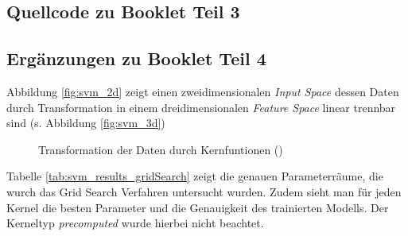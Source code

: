\subsection{Quellcode zu Booklet Teil 3}

\pagebreak
\subsection{Ergänzungen zu Booklet Teil 4}\label{app:svm_ergaenzungen}
Abbildung \ref{fig:svm_2d} zeigt einen zweidimensionalen \emph{Input Space} dessen Daten durch Transformation in einem dreidimensionalen \emph{Feature Space} linear trennbar sind (s. Abbildung \ref{fig:svm_3d})\\
\begin{figure}[h]
	\centering
	\hfill
	\caption{Transformation der Daten durch Kernfuntionen (\cite{2018_mello_ponti})}
\end{figure}
Tabelle \ref{tab:svm_results_gridSearch} zeigt die genauen Parameterräume, die wurch das Grid Search Verfahren untersucht wurden. Zudem sieht man für jeden Kernel die besten Parameter und die Genauigkeit des trainierten Modells. Der Kerneltyp \emph{precomputed} wurde hierbei nicht beachtet.
